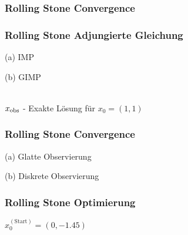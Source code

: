\begin{frame}[<+->]
\frametitle{Rolling Stone Convergence}
\centering
 
\end{frame}
\begin{frame}[<+->]
\frametitle{Rolling Stone Adjungierte Gleichung}
\begin{minipage}[c]{0.45\textwidth}
\centering
 
(a) IMP
\end{minipage}
\begin{minipage}[c]{0.45\textwidth}
\centering

(b) GIMP
\end{minipage}
\hfill
\centering
\\[0.6cm]
$x_\text{obs}$ - Exakte Lösung für $x_0=(1,1)$
\end{frame}

\begin{frame}[<+->]
\frametitle{Rolling Stone Convergence}
\centering
\begin{minipage}[c]{0.49\textwidth}
\centering

 
(a) Glatte Observierung
\end{minipage}
\hfill
\begin{minipage}[c]{0.49\textwidth}
\centering
 
(b) Diskrete Observierung
\end{minipage}

\end{frame}

\begin{frame}[<+->]
\frametitle{Rolling Stone Optimierung}
\begin{minipage}[c]{0.49\textwidth}
\centering
 
\end{minipage}
\hfill
\begin{minipage}[c]{0.49\textwidth}
\centering
  
\end{minipage}
\centering
$
x_0^{(\text{Start})}=(0,-1.45) 
$

\end{frame}


